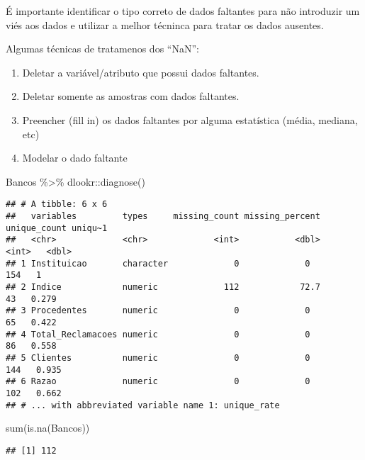 \documentclass[
]{article}
\newenvironment{Shaded}{\begin{snugshade}}{\end{snugshade}}
\newcommand{\FunctionTok}[1]{\textcolor[rgb]{0.00,0.00,0.00}{#1}}
\newcommand{\NormalTok}[1]{#1}
\newcommand{\SpecialCharTok}[1]{\textcolor[rgb]{0.00,0.00,0.00}{#1}}
\begin{document}
É importante identificar o tipo correto de dados faltantes para não
introduzir um viés aos dados e utilizar a melhor técninca para tratar os
dados ausentes.

Algumas técnicas de tratamenos dos ``NaN'':

\begin{enumerate}
\def\labelenumi{\arabic{enumi}.}
\item
  Deletar a variável/atributo que possui dados faltantes.
\item
  Deletar somente as amostras com dados faltantes.
\item
  Preencher (fill in) os dados faltantes por alguma estatística (média,
  mediana, etc)
\item
  Modelar o dado faltante
\end{enumerate}

\begin{Shaded}
\begin{Highlighting}[]
\NormalTok{Bancos }\SpecialCharTok{\%\textgreater{}\%}\NormalTok{ dlookr}\SpecialCharTok{::}\FunctionTok{diagnose}\NormalTok{()}
\end{Highlighting}
\end{Shaded}

\begin{verbatim}
## # A tibble: 6 x 6
##   variables         types     missing_count missing_percent unique_count uniqu~1
##   <chr>             <chr>             <int>           <dbl>        <int>   <dbl>
## 1 Instituicao       character             0             0            154   1    
## 2 Indice            numeric             112            72.7           43   0.279
## 3 Procedentes       numeric               0             0             65   0.422
## 4 Total_Reclamacoes numeric               0             0             86   0.558
## 5 Clientes          numeric               0             0            144   0.935
## 6 Razao             numeric               0             0            102   0.662
## # ... with abbreviated variable name 1: unique_rate
\end{verbatim}

\begin{Shaded}
\begin{Highlighting}[]
\FunctionTok{sum}\NormalTok{(}\FunctionTok{is.na}\NormalTok{(Bancos)) }
\end{Highlighting}
\end{Shaded}

\begin{verbatim}
## [1] 112
\end{verbatim}
\end{document}
